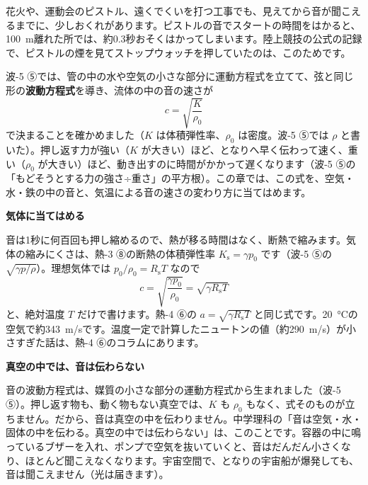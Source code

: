 花火や、運動会のピストル、遠くでくいを打つ工事でも、見えてから音が聞こえるまでに、少しおくれがあります。ピストルの音でスタートの時間をはかると、\qty{100}{m}離れた所では、約0.3秒おそくはかってしまいます。陸上競技の公式の記録で、ピストルの煙を見てストップウォッチを押していたのは、このためです。

\begin{phmodel}[雷までの距離]
\end{phmodel}


\leavevmode\label{ph:波-9:sec3}波-5 ⑤では、管の中の水や空気の小さな部分に運動方程式を立てて、弦と同じ形の\textbf{波動方程式}を導き、流体の中の音の速さが
\[ c=\sqrt{\frac{K}{\rho_0}} \]
\label{ph:波-9:sqrtK}で決まることを確かめました（$K$ は体積弾性率、$\rho_0$ は密度。波-5 ⑤では $\rho$ と書いた）。押し返す力が強い（$K$ が大きい）ほど、となりへ早く伝わって速く、重い（$\rho_0$ が大きい）ほど、動き出すのに時間がかかって遅くなります（波-5 ⑤の「もどそうとする力の強さ÷重さ」の平方根）。この章では、この式を、空気・水・鉄の中の音と、気温による音の速さの変わり方に当てはめます。

\noindent\textbf{気体に当てはめる}\par\nobreak
音は1秒に何百回も押し縮めるので、熱が移る時間はなく、断熱で縮みます。気体の縮みにくさは、熱-3 ⑧の断熱の体積弾性率 $K_{\mathrm s}=\gamma p_0$ です（波-5 ⑤の $\sqrt{\gamma p/\rho}$）。理想気体では $p_0/\rho_0=R_{\mathrm s}T$ なので
\[ c=\sqrt{\frac{\gamma p_0}{\rho_0}}=\sqrt{\gamma R_{\mathrm s}T} \]
と、絶対温度 $T$ だけで書けます。熱-4 ⑥の $a=\sqrt{\gamma R_{\mathrm s}T}$ と同じ式です。\qty{20}{\celsius}の空気で約\qty{343}{m/s}です。温度一定で計算したニュートンの値（約\qty{290}{m/s}）が小さすぎた話は、熱-4 ⑥のコラムにあります。

\noindent\textbf{真空の中では、音は伝わらない}\par\nobreak
\label{ph:波-9:A4}音の波動方程式は、媒質の小さな部分の運動方程式から生まれました（波-5 ⑤）。押し返す物も、動く物もない真空では、$K$ も $\rho_0$ もなく、式そのものが立ちません。だから、音は真空の中を伝わりません。中学理科の「音は空気・水・固体の中を伝わる。真空の中では伝わらない」は、このことです。容器の中に鳴っているブザーを入れ、ポンプで空気を抜いていくと、音はだんだん小さくなり、ほとんど聞こえなくなります。宇宙空間で、となりの宇宙船が爆発しても、音は聞こえません（光は届きます）。


